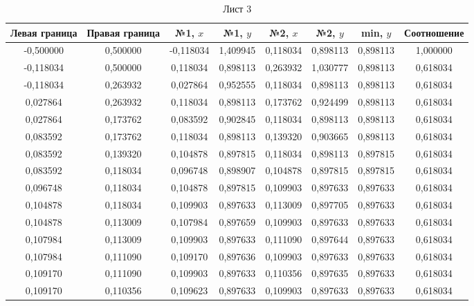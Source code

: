 
\begin{table}
\center
\begin{tabular}{cccccccc}
\toprule
Левая граница & Правая граница 
& №1, $x$ & №1, $y$ 
& №2, $x$ & №2, $y$ 
& min, $y$
  & Соотношение \\
\midrule
-0,500000 & 0,500000 & -0,118034 & 1,409945 & 0,118034 & 0,898113 & 0,898113 & 1,000000 \\
-0,118034 & 0,500000 & 0,118034  & 0,898113 & 0,263932 & 1,030777 & 0,898113 & 0,618034 \\
-0,118034 & 0,263932 & 0,027864  & 0,952555 & 0,118034 & 0,898113 & 0,898113 & 0,618034 \\
0,027864  & 0,263932 & 0,118034  & 0,898113 & 0,173762 & 0,924499 & 0,898113 & 0,618034 \\
0,027864  & 0,173762 & 0,083592  & 0,902845 & 0,118034 & 0,898113 & 0,898113 & 0,618034 \\
0,083592  & 0,173762 & 0,118034  & 0,898113 & 0,139320 & 0,903665 & 0,898113 & 0,618034 \\
0,083592  & 0,139320 & 0,104878  & 0,897815 & 0,118034 & 0,898113 & 0,897815 & 0,618034 \\
0,083592  & 0,118034 & 0,096748  & 0,898907 & 0,104878 & 0,897815 & 0,897815 & 0,618034 \\
0,096748  & 0,118034 & 0,104878  & 0,897815 & 0,109903 & 0,897633 & 0,897633 & 0,618034 \\
0,104878  & 0,118034 & 0,109903  & 0,897633 & 0,113009 & 0,897705 & 0,897633 & 0,618034 \\
0,104878  & 0,113009 & 0,107984  & 0,897659 & 0,109903 & 0,897633 & 0,897633 & 0,618034 \\
0,107984  & 0,113009 & 0,109903  & 0,897633 & 0,111090 & 0,897644 & 0,897633 & 0,618034 \\
0,107984  & 0,111090 & 0,109170  & 0,897636 & 0,109903 & 0,897633 & 0,897633 & 0,618034 \\
0,109170  & 0,111090 & 0,109903  & 0,897633 & 0,110356 & 0,897635 & 0,897633 & 0,618034 \\
0,109170  & 0,110356 & 0,109623  & 0,897633 & 0,109903 & 0,897633 & 0,897633 & 0,618034 \\
\bottomrule
\end{tabular}
\caption{Лист 3}
\end{table}


